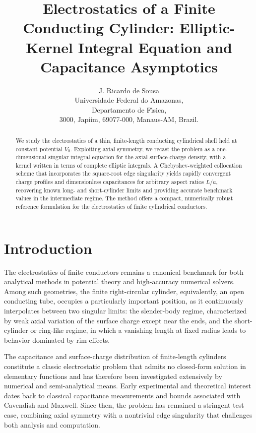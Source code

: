 \documentclass[12pt]{article}
\begin{document}
\title{Electrostatics of a Finite Conducting Cylinder: Elliptic-Kernel Integral
Equation and Capacitance Asymptotics}
\author{J. Ricardo de Sousa\\Universidade Federal do Amazonas,\\Departamento de F\'{\i}sica, \\3000, Japiim, 69077-000, Manaus-AM, Brazil.}
\date{}
\maketitle

\begin{abstract}
We study the electrostatics of a thin, finite-length conducting cylindrical
shell held at constant potential $V_{0}$. Exploiting axial symmetry, we recast
the problem as a one-dimensional singular integral equation for the axial
surface-charge density, with a kernel written in terms of complete elliptic
integrals. A Chebyshev-weighted collocation scheme that incorporates the
square-root edge singularity yields rapidly convergent charge profiles and
dimensionless capacitances for arbitrary aspect ratios $L/a$, recovering known
long- and short-cylinder limits and providing accurate benchmark values in the
intermediate regime. The method offers a compact, numerically robust reference
formulation for the electrostatics of finite cylindrical conductors.

\end{abstract}

\section{Introduction}

The electrostatics of finite conductors remains a canonical benchmark for both
analytical methods in potential theory and high-accuracy numerical solvers.
Among such geometries, the finite right-circular cylinder, equivalently, an
open conducting tube, occupies a particularly important position, as it
continuously interpolates between two singular limits: the slender-body
regime, characterized by weak axial variation of the surface charge except
near the ends, and the short-cylinder or ring-like regime, in which a
vanishing length at fixed radius leads to behavior dominated by rim effects.

The capacitance and surface-charge distribution of finite-length cylinders
constitute a classic electrostatic problem that admits no closed-form solution
in elementary functions and has therefore been investigated extensively by
numerical and semi-analytical means. Early experimental and theoretical
interest dates back to classical capacitance measurements and bounds
associated with Cavendish and Maxwell\cite{c1,maxwell}. Since then, the
problem has remained a stringent test case, combining axial symmetry with a
nontrivial edge singularity that challenges both analysis and
computation\cite{c2}.
\end{document}
